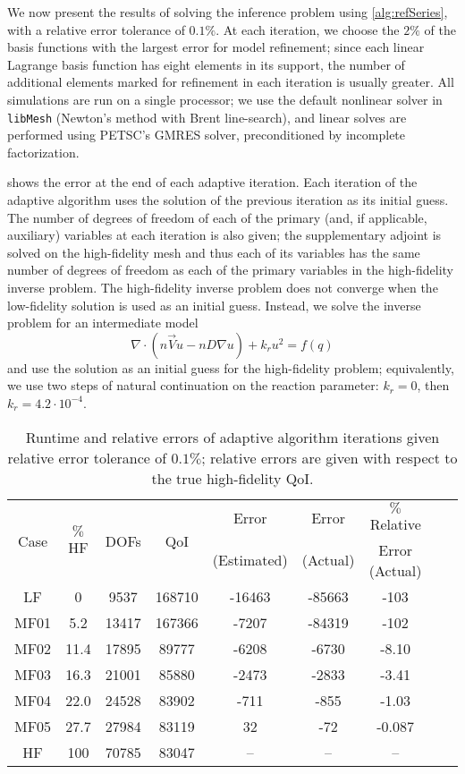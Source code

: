 We now present the results of solving the inference problem using \cref{alg:refSeries}, with a relative error tolerance of $0.1\%$. At each iteration, we choose the $2\%$ of the basis functions with the largest error for model refinement; since each linear Lagrange basis function has eight elements in its support, the number of additional elements marked for refinement in each iteration is usually greater. All simulations are run on a single processor; we use the default nonlinear solver in \texttt{libMesh} (Newton's method with Brent line-search), and linear solves are performed using PETSC's GMRES solver, preconditioned by incomplete factorization. 

 shows the error at the end of each adaptive iteration. Each iteration of the adaptive algorithm uses the solution of the previous iteration as its initial guess. The number of degrees of freedom of each of the primary (and, if applicable, auxiliary) variables at each iteration is also given; the supplementary adjoint is solved on the high-fidelity mesh and thus each of its variables has the same number of degrees of freedom as each of the primary variables in the high-fidelity inverse problem. The high-fidelity inverse problem does not converge when the low-fidelity solution is used as an initial guess. Instead, we solve the inverse problem for an intermediate model 
%
\begin{equation}
\nabla\cdot(n\vec{V}u - nD\nabla u) + k_ru^2 = f(q)
\end{equation}
%
and use the solution as an initial guess for the high-fidelity problem; equivalently, we use two steps of natural continuation on the reaction parameter: $k_r=0$, then $k_r=4.2\cdot10^{-4}$. 
%
\begin{table}[htbp]
\caption{Runtime and relative errors of adaptive algorithm iterations given relative error tolerance of $0.1\%$; relative errors are given with respect to the true high-fidelity QoI.}
\label{tab:ref3D_diffmesh}
\centering
\begin{tabular}{|c|c|c|c|c|c|c|c|c|}
\hline
\multirow{2}{*}{Case} & \multirow{2}{*}{$\%$HF} & \multirow{2}{*}{DOFs} & \multirow{2}{*}{QoI} & Error & Error & $\%$ Relative \\ 
& & & & (Estimated) & (Actual) & Error (Actual)  \\ \hline
LF   & 0    & 9537  & 168710 & -16463 & -85663 & -103    \\
MF01 & 5.2  & 13417 & 167366 & -7207  & -84319 & -102    \\
MF02 & 11.4 & 17895 & 89777  & -6208  & -6730  & -8.10   \\
MF03 & 16.3 & 21001 & 85880  & -2473  & -2833  & -3.41   \\
MF04 & 22.0 & 24528 & 83902  & -711   & -855   & -1.03   \\
MF05 & 27.7 & 27984 & 83119  & 32     & -72    & -0.087  \\
HF   & 100  & 70785 & 83047  & --     & --     & --    \\ \hline
\end{tabular}
\end{table}
%

